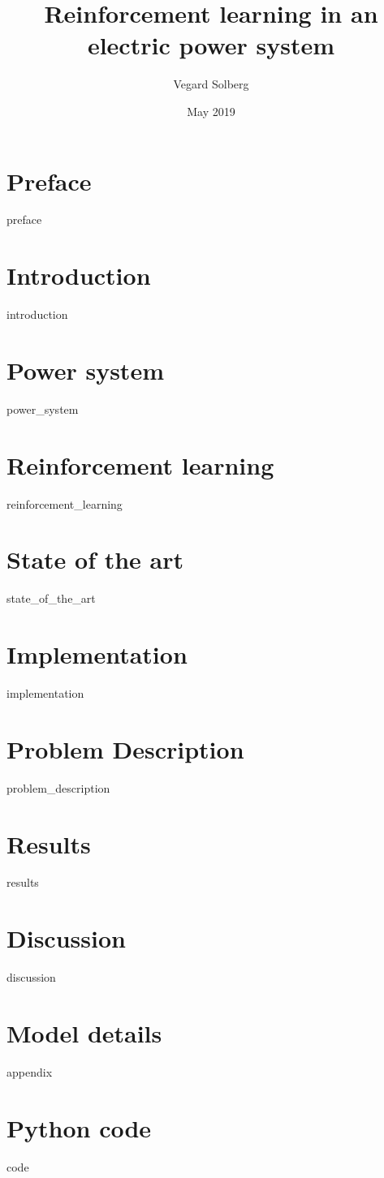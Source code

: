 \documentclass{book}
\title{Reinforcement learning in an electric power system}
\author{Vegard Solberg}
\date{May 2019}
\begin{document}
 
    \maketitle
    \frontmatter
    \chapter{Preface}
    {preface}
    
    \tableofcontents
    
    \mainmatter
    \chapter{Introduction}
    {introduction}
    
    \chapter{Power system}
    {power_system}
 
    \chapter{Reinforcement learning}
    {reinforcement_learning}
    
    \chapter{State of the art}
    {state_of_the_art}
    
    \chapter{Implementation}
    {implementation}
    
    \chapter{Problem Description}
    {problem_description}
    
    
    \chapter{Results}
    {results}
    
    \chapter{Discussion}
    {discussion}
    \printbibliography

    \appendix
    \chapter{Model details}
    {appendix}
    
    \chapter{Python code}
    {code}
    
\end{document}
